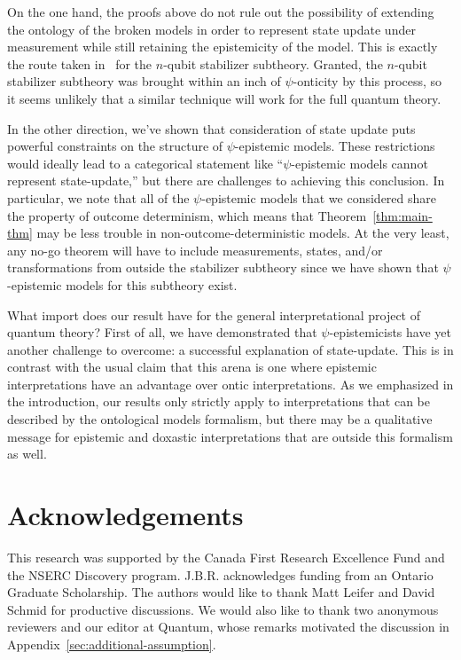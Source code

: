 \documentclass[%
 reprint,
superscriptaddress,
nofootinbib,
 amsmath,amssymb,
 prx, 
 accepted=2019-09-27,
]{quantumarticle}
\begin{document}
On the one hand, the proofs above do not rule out the possibility of
extending the ontology of the broken models in order to represent
state update under measurement while still retaining the epistemicity
of the model. This is exactly the route taken
in~\cite{LillystoneContextualpsEpistemicModel2019} for the $n$-qubit
stabilizer subtheory. Granted, the $n$-qubit stabilizer subtheory was
brought within an inch of $\psi$-onticity by this process, so it seems
unlikely that a similar technique will work for the full quantum
theory.

In the other direction, we've shown that consideration of state update
puts powerful constraints on the structure of $\psi$-epistemic models.
These restrictions would ideally lead to a categorical statement like
``$\psi$-epistemic models cannot represent state-update,'' but there
are challenges to achieving this conclusion. In particular, we note
that all of the $\psi$-epistemic models that we considered share the
property of outcome determinism, which means that
Theorem~\ref{thm:main-thm} may be less trouble in
non-outcome-deterministic models. At the very least, any no-go theorem
will have to include measurements, states, and/or transformations from
outside the stabilizer subtheory since we have shown that
$\psi$-epistemic models for this subtheory exist.

What import does our result have for the general interpretational
project of quantum theory? First of all, we have demonstrated that
$\psi$-epistemicists have yet another challenge to overcome: a
successful explanation of state-update. This is in contrast with the
usual claim that this arena is one where epistemic interpretations
have an advantage over ontic interpretations. As we emphasized in the
introduction, our results only strictly apply to interpretations that
can be described by the ontological models formalism, but there may be
a qualitative message for epistemic and doxastic interpretations that
are outside this formalism as well.




\section{Acknowledgements}
This research was supported by the Canada First Research Excellence
Fund and the NSERC Discovery program. J.B.R. acknowledges funding from
an Ontario Graduate Scholarship. The authors would like to thank Matt
Leifer and David Schmid for productive discussions. We would also like
to thank two anonymous reviewers and our editor at Quantum, whose
remarks motivated the discussion in
Appendix~\ref{sec:additional-assumption}.
\end{document}
